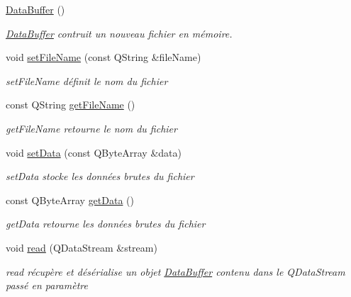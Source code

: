 \begin{DoxyCompactItemize}
\item 
\hypertarget{class_data_buffer_a83f823dc058fe550713806bb49dd9651}{\hyperlink{class_data_buffer_a83f823dc058fe550713806bb49dd9651}{Data\+Buffer} ()}\label{class_data_buffer_a83f823dc058fe550713806bb49dd9651}

\begin{DoxyCompactList}\small\item\em \hyperlink{class_data_buffer}{Data\+Buffer} contruit un nouveau fichier en mémoire. \end{DoxyCompactList}\item 
void \hyperlink{class_data_buffer_a020c2a9e6f84f77fb7424845ae532da4}{set\+File\+Name} (const Q\+String \&file\+Name)
\begin{DoxyCompactList}\small\item\em set\+File\+Name définit le nom du fichier \end{DoxyCompactList}\item 
const Q\+String \hyperlink{class_data_buffer_ac63e75c4e19e45b2d70f1879c6f7e34e}{get\+File\+Name} ()
\begin{DoxyCompactList}\small\item\em get\+File\+Name retourne le nom du fichier \end{DoxyCompactList}\item 
void \hyperlink{class_data_buffer_ada256ca15ccca7e92c733bd45c939741}{set\+Data} (const Q\+Byte\+Array \&data)
\begin{DoxyCompactList}\small\item\em set\+Data stocke les données brutes du fichier \end{DoxyCompactList}\item 
const Q\+Byte\+Array \hyperlink{class_data_buffer_a37aa198c3266ac7fe4925157d6bfd0d1}{get\+Data} ()
\begin{DoxyCompactList}\small\item\em get\+Data retourne les données brutes du fichier \end{DoxyCompactList}\item 
void \hyperlink{class_data_buffer_a4c865943b6b4c3f802fefbdefdfc912a}{read} (Q\+Data\+Stream \&stream)
\begin{DoxyCompactList}\small\item\em read récupère et désérialise un objet \hyperlink{class_data_buffer}{Data\+Buffer} contenu dans le Q\+Data\+Stream passé en paramètre \end{DoxyCompactList}\item 

\end{DoxyCompactItemize}
